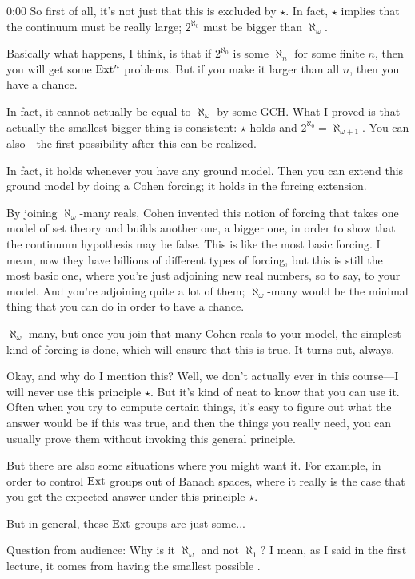\begin{unfinished}{0:00}
So first of all, it's not just that this is excluded by $\star$. In fact, $\star$ implies that the continuum must be really large; $2^{\aleph_0}$ must be bigger than $\aleph_\omega$.

Basically what happens, I think, is that if $2^{\aleph_0}$ is some $\aleph_n$ for some finite $n$, then you will get some $\operatorname{Ext}^n$ problems. But if you make it larger than all $n$, then you have a chance.

In fact, it cannot actually be equal to $\aleph_\omega$ by some GCH. What I proved is that actually the smallest bigger thing is consistent: $\star$ holds and $2^{\aleph_0} = \aleph_{\omega+1}$. You can also---the first possibility after this can be realized.

In fact, it holds whenever you have any ground model. Then you can extend this ground model by doing a Cohen forcing; it holds in the forcing extension.

By joining $\aleph_\omega$-many reals, Cohen invented this notion of forcing that takes one model of set theory and builds another one, a bigger one, in order to show that the continuum hypothesis may be false. This is like the most basic forcing. I mean, now they have billions of different types of forcing, but this is still the most basic one, where you're just adjoining new real numbers, so to say, to your model. And you're adjoining quite a lot of them; $\aleph_\omega$-many would be the minimal thing that you can do in order to have a chance.

$\aleph_\omega$-many, but once you join that many Cohen reals to your model, the simplest kind of forcing is done, which will ensure that this is true. It turns out, always.

Okay, and why do I mention this? Well, we don't actually ever in this course---I will never use this principle $\star$. But it's kind of neat to know that you can use it. Often when you try to compute certain things, it's easy to figure out what the answer would be if this was true, and then the things you really need, you can usually prove them without invoking this general principle.

But there are also some situations where you might want it. For example, in order to control $\operatorname{Ext}$ groups out of Banach spaces, where it really is the case that you get the expected answer under this principle $\star$.

But in general, these $\operatorname{Ext}$ groups are just some... 

Question from audience: Why is it $\aleph_\omega$ and not $\aleph_1$? I mean, as I said in the first lecture, it comes from having the smallest possible .


\end{unfinished}
